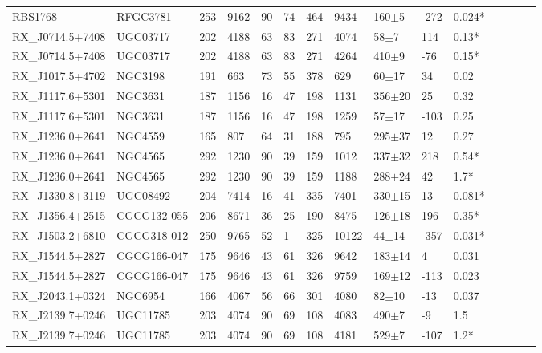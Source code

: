 \documentclass[iop]{emulateapj-rtx4}
\begin{document}
\begin{table}[ht]
\begin{center}
\begin{tabular}{l l l l l l l l l l l l l l l}
RBS1768  &  RFGC3781  &  253  &  9162  &  90  &  74  &  464  &  9434  &  160$\pm$5  &  -272  &  0.024*  \\
RX\_J0714.5+7408  &  UGC03717  &  202  &  4188  &  63  &  83  &  271  &  4074  &  58$\pm$7  &  114  &  0.13*  \\
RX\_J0714.5+7408  &  UGC03717  &  202  &  4188  &  63  &  83  &  271  &  4264  &  410$\pm$9  &  -76  &  0.15*  \\
RX\_J1017.5+4702  &  NGC3198  &  191  &  663  &  73  &  55  &  378  &  629  &  60$\pm$17  &  34  &  0.02  \\
RX\_J1117.6+5301  &  NGC3631  &  187  &  1156  &  16  &  47  &  198  &  1131  &  356$\pm$20  &  25  &  0.32  \\
RX\_J1117.6+5301  &  NGC3631  &  187  &  1156  &  16  &  47  &  198  &  1259  &  57$\pm$17  &  -103  &  0.25  \\
RX\_J1236.0+2641  &  NGC4559  &  165  &  807  &  64  &  31  &  188  &  795  &  295$\pm$37  &  12  &  0.27  \\
RX\_J1236.0+2641  &  NGC4565  &  292  &  1230  &  90  &  39  &  159  &  1012  &  337$\pm$32  &  218  &  0.54*  \\
RX\_J1236.0+2641  &  NGC4565  &  292  &  1230  &  90  &  39  &  159  &  1188  &  288$\pm$24  &  42  &  1.7*  \\
RX\_J1330.8+3119  &  UGC08492  &  204  &  7414  &  16  &  41  &  335  &  7401  &  330$\pm$15  &  13  &  0.081*  \\
RX\_J1356.4+2515  &  CGCG132-055  &  206  &  8671  &  36  &  25  &  190  &  8475  &  126$\pm$18  &  196  &  0.35*  \\
RX\_J1503.2+6810  &  CGCG318-012  &  250  &  9765  &  52  &  1  &  325  &  10122  &  44$\pm$14  &  -357  &  0.031*  \\
RX\_J1544.5+2827  &  CGCG166-047  &  175  &  9646  &  43  &  61  &  326  &  9642  &  183$\pm$14  &  4  &  0.031  \\
RX\_J1544.5+2827  &  CGCG166-047  &  175  &  9646  &  43  &  61  &  326  &  9759  &  169$\pm$12  &  -113  &  0.023  \\
RX\_J2043.1+0324  &  NGC6954  &  166  &  4067  &  56  &  66  &  301  &  4080  &  82$\pm$10  &  -13  &  0.037  \\
RX\_J2139.7+0246  &  UGC11785  &  203  &  4074  &  90  &  69  &  108  &  4083  &  490$\pm$7  &  -9  &  1.5  \\
RX\_J2139.7+0246  &  UGC11785  &  203  &  4074  &  90  &  69  &  108  &  4181  &  529$\pm$7  &  -107  &  1.2*  \\

\end{tabular}
\end{center}
\end{table}
\end{document}
